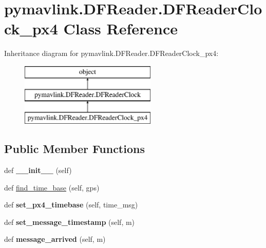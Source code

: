 \hypertarget{classpymavlink_1_1DFReader_1_1DFReaderClock__px4}{}\section{pymavlink.\+D\+F\+Reader.\+D\+F\+Reader\+Clock\+\_\+px4 Class Reference}
\label{classpymavlink_1_1DFReader_1_1DFReaderClock__px4}
Inheritance diagram for pymavlink.\+D\+F\+Reader.\+D\+F\+Reader\+Clock\+\_\+px4\+:\begin{figure}[H]
\begin{center}
\leavevmode
\includegraphics[height=3.000000cm]{classpymavlink_1_1DFReader_1_1DFReaderClock__px4}
\end{center}
\end{figure}
\subsection*{Public Member Functions}
\begin{DoxyCompactItemize}
\item 
\mbox{\label{classpymavlink_1_1DFReader_1_1DFReaderClock__px4_a6fb11e110087f31f5c7cce4b8ee95a36}} 
def {\bfseries \+\_\+\+\_\+init\+\_\+\+\_\+} (self)
\item 
def \hyperlink{classpymavlink_1_1DFReader_1_1DFReaderClock__px4_a7c7fbdf0097f50a76ebc096626a7be93}{find\+\_\+time\+\_\+base} (self, gps)
\item 
\mbox{\label{classpymavlink_1_1DFReader_1_1DFReaderClock__px4_aff4c8d2386feb420eb1e53498c2f5ed6}} 
def {\bfseries set\+\_\+px4\+\_\+timebase} (self, time\+\_\+msg)
\item 
\mbox{\label{classpymavlink_1_1DFReader_1_1DFReaderClock__px4_aa489a357b826b628cf3df17231ad9e8e}} 
def {\bfseries set\+\_\+message\+\_\+timestamp} (self, m)
\item 
\mbox{\label{classpymavlink_1_1DFReader_1_1DFReaderClock__px4_a8579ed60c84cf8ff01bce19e716a434f}} 
def {\bfseries message\+\_\+arrived} (self, m)
\end{DoxyCompactItemize}
